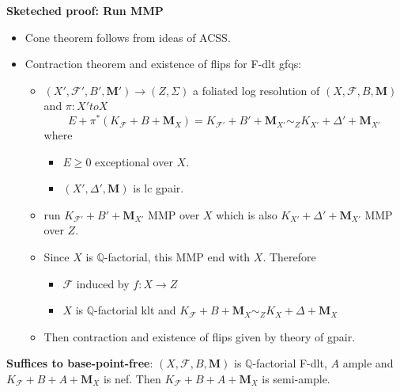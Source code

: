 \documentclass{article}
\begin{document}
\textbf{Sketeched proof: Run MMP}
\begin{itemize}
  \item Cone theorem follows from ideas of ACSS.
  \item Contraction theorem and existence of flips for F-dlt gfqs:
    \begin{itemize}
      \item $ (X',\mathcal{F}',B',\mathbf{M}')\to (Z,\Sigma) $ a foliated log resolution of $ (X,\mathcal{F},B,\mathbf{M}) $ and $ \pi: X' to X $
        \[
          E+ \pi^{*}(K_{\mathcal{F}}+B+\mathbf{M}_{X})=K_{\mathcal{F}'}+B'+\mathbf{M}_{X'}\sim_{Z} K_{X'}+\Delta'+\mathbf{M}_{X'} 
        \]
        where
        \begin{itemize}
          \item $ E \geqslant 0$ exceptional over $X$.
          \item $ (X',\Delta',\mathbf{M}) $ is lc gpair.
        \end{itemize}
      \item run $ K_{\mathcal{F}'}+B'+\mathbf{M}_{X'} $ MMP over $X$ which is also $ K_{X'}+\Delta'+\mathbf{M}_{X'} $ MMP over $Z$.  
      \item Since $X$ is $\mathbb{Q}$-factorial, this MMP end with $X$. Therefore
        \begin{itemize}
          \item $ \mathcal{F} $ induced by $ f:X\to Z $
          \item $X$ is $\mathbb{Q}$-factorial klt and $ K_{\mathcal{F}}+B+\mathbf{M}_{X}\sim_{Z} K_{X}+\Delta+\mathbf{M}_{X} $ 
        \end{itemize}
      \item Then contraction and existence of flips given by theory of gpair.
    \end{itemize}
\end{itemize}

\textbf{Suffices to base-point-free}: $ (X,\mathcal{F},B,\mathbf{M}) $ is $\mathbb{Q}$-factorial F-dlt, $A$ ample and $ K_{\mathcal{F}}+B+A+\mathbf{M}_{X} $ is nef. Then $ K_{\mathcal{F}}+B+A+\mathbf{M}_{X}  $ is semi-ample. 
\end{document}
